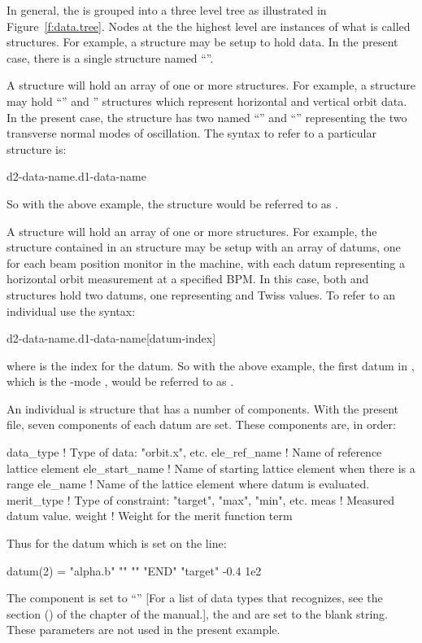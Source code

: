 \documentclass{hitec}     %
\begin{document}
{In general, the  is grouped into a three level tree as illustrated in
Figure~\ref{f:data.tree}. Nodes at the the highest level are instances of what is called
 structures. For example, a  structure may be setup to hold  data.
In the present case, there is a single  structure named ``''. 

A  structure will hold an array of one or more  structures. For example, a
  structure may hold ``'' and ''  structures which
represent horizontal and vertical orbit data. In the present case, the  
structure has two  named ``'' and ``'' representing the two
transverse normal modes of oscillation. The syntax to refer to a particular  structure
is:
\begin{code}
  d2-data-name.d1-data-name
\end{code}
So with the above example, the  structure would be referred to as  .

A  structure will hold an array of one or more  structures. For example, the
  structure contained in an   structure may be setup with an
array of datums, one for each beam position monitor in the machine, with each datum representing a
horizontal orbit measurement at a specified BPM. In this case, both  and  
structures hold two datums, one representing {\textbeta} and {\textalpha} Twiss values.  To refer to
an individual  use the syntax:
\begin{code}
  d2-data-name.d1-data-name[datum-index]
\end{code}
where  is the index for the datum. So with the above example, the first datum in
, which is the -mode {\textbeta}, would be referred to as  .

An individual  is structure that has a number of components. With the present
 file, seven components of each datum are set. These components are, in order:
\begin{code}
data_type       ! Type of data: "orbit.x", etc.
ele_ref_name    ! Name of reference lattice element
ele_start_name  ! Name of starting lattice element when there is a range
ele_name        ! Name of the lattice element where datum is evaluated.
merit_type      ! Type of constraint: "target", "max", "min", etc.
meas            ! Measured datum value.
weight          ! Weight for the merit function term
\end{code}
Thus for the  datum which is set on the line:
\begin{code}
  datum(2) =  "alpha.b"    "" "" "END"   "target" -0.4    1e2
\end{code}
The  component is set to ``'' [For a list of data types that \tao
recognizes, see the  section () of the  chapter
of the \tao manual.], the  and  are set to the blank
string. These parameters are not used in the present example.

}
\end{document}
